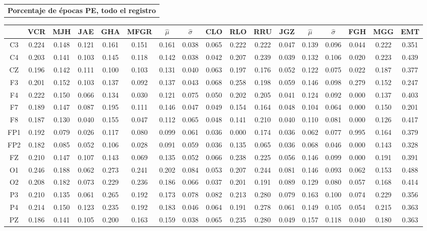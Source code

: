 \documentclass[12pt,a4paper]{mitthesis}
\begin{document}
\begin{SidewaysFigure}
\centering
\begin{tabular}{c}
\textbf{Porcentaje de \'epocas PE, todo el registro}
\vspace{1em}
\end{tabular}
\begin{tabular}{c||ccccc|cc||cccc|cc||ccc}
& VCR & MJH & JAE & GHA & MFGR &$\widehat{\mu}$ & $\widehat{\sigma}$
& CLO & RLO & RRU & JGZ &$\widehat{\mu}$ & $\widehat{\sigma}$
& FGH & MGG & EMT \\
\hline
C3&0.224&0.148&0.121&0.161&0.151&0.161&0.038&0.065&0.222&0.222&0.047&0.139&0.096&0.044&0.222&0.351 \\
C4&0.203&0.141&0.103&0.145&0.118&0.142&0.038&0.042&0.207&0.239&0.039&0.132&0.106&0.020&0.223&0.439 \\
CZ&0.196&0.142&0.111&0.100&0.103&0.131&0.040&0.063&0.197&0.176&0.052&0.122&0.075&0.022&0.187&0.377 \\
F3&0.201&0.152&0.103&0.137&0.092&0.137&0.043&0.068&0.258&0.198&0.059&0.146&0.098&0.279&0.152&0.247 \\
F4&0.222&0.150&0.066&0.134&0.030&0.121&0.075&0.050&0.202&0.205&0.041&0.124&0.092&0.000&0.137&0.403 \\
F7&0.189&0.147&0.087&0.195&0.111&0.146&0.047&0.049&0.154&0.164&0.048&0.104&0.064&0.000&0.150&0.201 \\
F8&0.187&0.130&0.040&0.155&0.047&0.112&0.065&0.048&0.141&0.210&0.040&0.110&0.081&0.000&0.126&0.417 \\
FP1&0.192&0.079&0.026&0.117&0.080&0.099&0.061&0.036&0.000&0.174&0.036&0.062&0.077&0.995&0.164&0.379 \\
FP2&0.182&0.085&0.052&0.106&0.028&0.091&0.059&0.036&0.135&0.065&0.036&0.068&0.046&0.000&0.143&0.328 \\
FZ&0.210&0.147&0.107&0.143&0.069&0.135&0.052&0.066&0.238&0.225&0.056&0.146&0.099&0.000&0.191&0.391 \\
O1&0.246&0.188&0.062&0.273&0.241&0.202&0.084&0.053&0.207&0.244&0.081&0.146&0.093&0.062&0.153&0.488 \\
O2&0.208&0.182&0.073&0.229&0.236&0.186&0.066&0.037&0.201&0.191&0.089&0.129&0.080&0.057&0.168&0.414 \\
P3&0.210&0.135&0.061&0.265&0.192&0.173&0.078&0.082&0.213&0.280&0.079&0.163&0.100&0.074&0.229&0.356 \\
P4&0.214&0.150&0.123&0.235&0.192&0.183&0.046&0.064&0.191&0.278&0.061&0.149&0.105&0.054&0.215&0.363 \\
PZ&0.186&0.141&0.105&0.200&0.163&0.159&0.038&0.065&0.235&0.280&0.049&0.157&0.118&0.040&0.180&0.363 \\

\end{tabular}
\end{SidewaysFigure}
\end{document}
